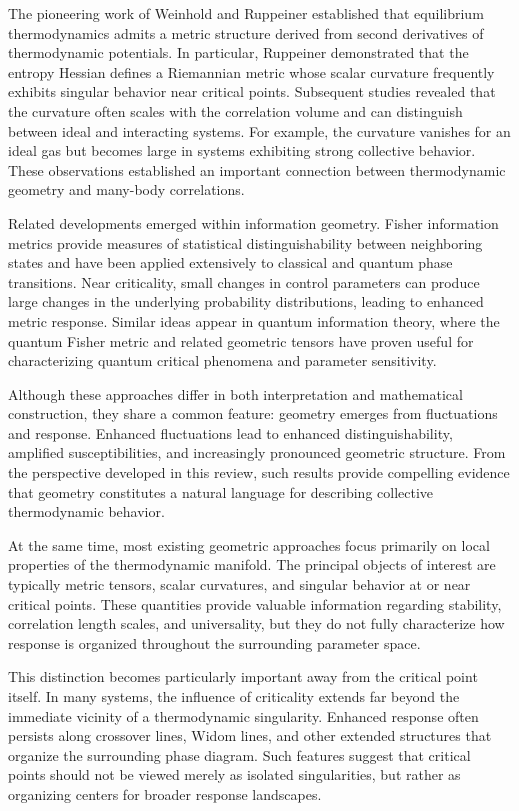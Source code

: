 The pioneering work of Weinhold and Ruppeiner established that equilibrium thermodynamics admits a metric structure derived from second derivatives of thermodynamic potentials. In particular, Ruppeiner demonstrated that the entropy Hessian defines a Riemannian metric whose scalar curvature frequently exhibits singular behavior near critical points. Subsequent studies revealed that the curvature often scales with the correlation volume and can distinguish between ideal and interacting systems. For example, the curvature vanishes for an ideal gas but becomes large in systems exhibiting strong collective behavior. These observations established an important connection between thermodynamic geometry and many-body correlations.

Related developments emerged within information geometry. Fisher information metrics provide measures of statistical distinguishability between neighboring states and have been applied extensively to classical and quantum phase transitions. Near criticality, small changes in control parameters can produce large changes in the underlying probability distributions, leading to enhanced metric response. Similar ideas appear in quantum information theory, where the quantum Fisher metric and related geometric tensors have proven useful for characterizing quantum critical phenomena and parameter sensitivity.

Although these approaches differ in both interpretation and mathematical construction, they share a common feature: geometry emerges from fluctuations and response. Enhanced fluctuations lead to enhanced distinguishability, amplified susceptibilities, and increasingly pronounced geometric structure. From the perspective developed in this review, such results provide compelling evidence that geometry constitutes a natural language for describing collective thermodynamic behavior.

At the same time, most existing geometric approaches focus primarily on local properties of the thermodynamic manifold. The principal objects of interest are typically metric tensors, scalar curvatures, and singular behavior at or near critical points. These quantities provide valuable information regarding stability, correlation length scales, and universality, but they do not fully characterize how response is organized throughout the surrounding parameter space.

This distinction becomes particularly important away from the critical point itself. In many systems, the influence of criticality extends far beyond the immediate vicinity of a thermodynamic singularity. Enhanced response often persists along crossover lines, Widom lines, and other extended structures that organize the surrounding phase diagram. Such features suggest that critical points should not be viewed merely as isolated singularities, but rather as organizing centers for broader response landscapes.

